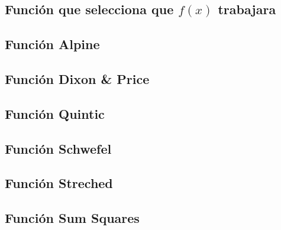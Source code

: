 \documentclass[10pt]{article}
\begin{document}
\subsection{Función que selecciona que $f(x)$ trabajara}
\begin{center}
  
\end{center}
\subsection{Función Alpine}
\begin{center}
  
\end{center}

\subsection{Función Dixon \& Price}
\begin{center}
  
\end{center}

\subsection{Función Quintic}
\begin{center}
  
\end{center}

\subsection{Función Schwefel}
\begin{center}
  
\end{center}

\subsection{Función Streched}
\begin{center}
  
\end{center}

\subsection{Función Sum Squares}
\begin{center}
  
\end{center}
\end{document}
